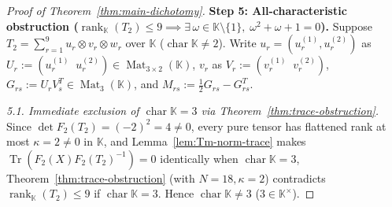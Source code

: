 \documentclass[11pt,reqno]{amsart}
\theoremstyle{definition}
\theoremstyle{remark}
\numberwithin{equation}{section}
\newcommand{\KK}{\mathbb{K}}
\DeclareMathOperator{\rk}{rank}
\DeclareMathOperator{\Mat}{Mat}
\DeclareMathOperator{\Tr}{Tr}
\DeclareMathOperator{\chr}{char}
\begin{document}
\begin{proof}[Proof of Theorem~\ref{thm:main-dichotomy}]
\medskip
\noindent\textbf{Step 5: All-characteristic obstruction ($\rk_{\KK}(T_2) \le 9 \implies \exists\,\omega \in \KK\setminus\{1\},\; \omega^2+\omega+1=0$).}
Suppose $T_2 = \sum_{r=1}^9 u_r \otimes v_r \otimes w_r$ over $\KK$ ($\chr\KK \neq 2$). Write $u_r = (u_r^{(1)}, u_r^{(2)})$ as $U_r := (u_r^{(1)}\;\; u_r^{(2)}) \in \Mat_{3 \times 2}(\KK)$, $v_r$ as $V_r := (v_r^{(1)}\;\; v_r^{(2)})$, $G_{rs} := U_r V_s^T \in \Mat_3(\KK)$, and $M_{rs} := \frac{1}{2}G_{rs} - G_{rs}^T$.

\emph{5.1. Immediate exclusion of $\chr\KK = 3$ via Theorem~\ref{thm:trace-obstruction}.}
Since $\det F_2(T_2) = (-2)^2 = 4 \neq 0$, every pure tensor has flattened rank at most $\kappa = 2 \neq 0$ in $\KK$, and Lemma~\ref{lem:Tm-norm-trace} makes $\Tr(F_2(X) F_2(T_2)^{-1}) = 0$ identically when $\chr\KK = 3$, Theorem~\ref{thm:trace-obstruction} (with $N = 18, \kappa = 2$) contradicts $\rk_{\KK}(T_2) \le 9$ if $\chr\KK = 3$. Hence $\chr\KK \neq 3$ ($3 \in \KK^\times$).


\end{proof}
\end{document}
